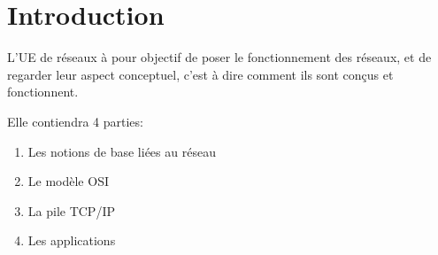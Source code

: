 \section{Introduction}
L'UE de réseaux à pour objectif de poser le fonctionnement des réseaux, et de regarder leur aspect
conceptuel, c'est à dire comment ils sont conçus et fonctionnent.

Elle contiendra 4 parties:
\begin{enumerate}
	\item Les notions de base liées au réseau
	\item Le modèle OSI
	\item La pile TCP/IP
	\item Les applications
\end{enumerate}
